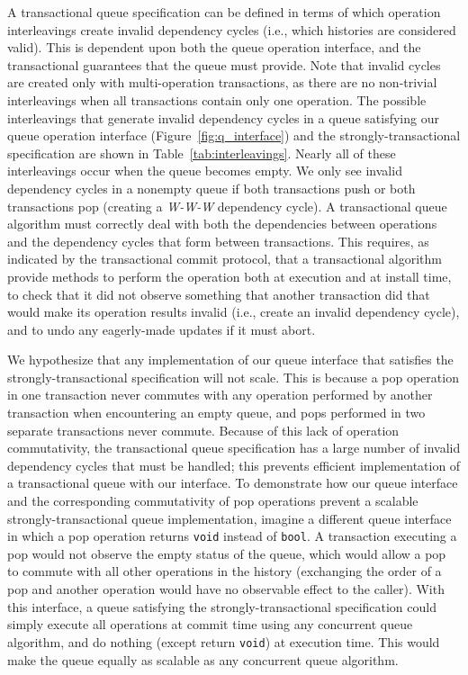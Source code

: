 A transactional queue specification can be defined in terms of which operation interleavings create invalid dependency cycles (i.e., which histories are considered valid). This is dependent upon both the queue operation interface, and the transactional guarantees that the queue must provide. Note that invalid cycles are created only with multi-operation transactions, as there are no non-trivial interleavings when all transactions contain only one operation.
The possible interleavings that generate invalid dependency cycles in a queue satisfying our queue operation interface (Figure~\ref{fig:q_interface}) and the strongly-transactional specification are shown in Table~\ref{tab:interleavings}. Nearly all of these interleavings occur when the queue becomes empty. We only see invalid dependency cycles in a nonempty queue if both transactions push or both transactions pop (creating a \emph{W-W-W} dependency cycle). A transactional queue algorithm must correctly deal with both the dependencies between operations and the dependency cycles that form between transactions. This requires, as indicated by the transactional commit protocol, that a transactional algorithm provide methods to perform the operation both at execution and at install time, to check that it did not observe something that another transaction did that would make its operation results invalid (i.e., create an invalid dependency cycle), and to undo any eagerly-made updates if it must abort. 

We hypothesize that any implementation of our queue interface that satisfies the strongly-transactional specification will not scale. This is because a pop operation in one transaction never commutes with any operation performed by another transaction when encountering an empty queue, and pops performed in two separate transactions never commute. Because of this lack of operation commutativity, the transactional queue specification has a large number of invalid dependency cycles that must be handled; this prevents efficient implementation of a transactional queue with our interface. To demonstrate how our queue interface and the corresponding commutativity of pop operations prevent a scalable strongly-transactional queue implementation, imagine a different queue interface in which a pop operation returns \texttt{void} instead of \texttt{bool}. A transaction executing a pop would not observe the empty status of the queue, which would allow a pop to commute with all other operations in the history (exchanging the order of a pop and another operation would have no observable effect to the caller). With this interface, a queue satisfying the strongly-transactional specification could simply execute all operations at commit time using any concurrent queue algorithm, and do nothing (except return \texttt{void}) at execution time. This would make the queue equally as scalable as any concurrent queue algorithm.

